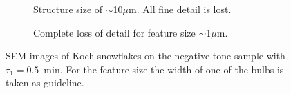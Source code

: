 \begin{figure}[htb]
\begin{subfigure}[t]{0.32\linewidth}
      	\caption{Structure size of $\sim$10$\mu$m. All fine detail is lost.}
      	\label{fig:b2d36_q37}
    \end{subfigure}
    \hfill
    \begin{subfigure}[t]{0.32\linewidth}
      	\caption{Complete loss of detail for feature size $\sim$1$\mu$m.}
      	\label{fig:b2d38_q38}
    \end{subfigure}
    \caption{SEM images of Koch snowflakes on the negative tone sample with $\tau_1=0.5$~min. For the feature size the width of one of the bulbs is taken as guideline.}
\end{figure}



